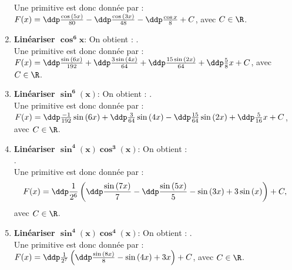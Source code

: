 \begin{correction}
\begin{enumerate}
Une primitive est donc donn\'ee par : $F(x) = \ddp\frac{\cos{(5x)}}{80}-\ddp\frac{\cos{(3x)}}{48}-\ddp\frac{\cos{x}}{8}+C$, avec $C \in \R$.
\item \textbf{Lin\'eariser $\mathbf{\cos^6{x}}$}: On obtient : .\\
Une primitive est donc donn\'ee par : $F(x) = \ddp\frac{\sin{(6x)}}{192}+\ddp\frac{3\sin{(4x)}}{64}+\ddp\frac{15\sin{(2x)}}{64}+\ddp\frac{5}{8}x+C$, avec $C \in \R$.
\item \textbf{Lin\'eariser $\mathbf{\sin^6{(x)}}$}: On obtient : .\\
Une primitive est donc donn\'ee par : $F(x) = \ddp\frac{-1}{192} \sin{(6x)} +\ddp\frac{3}{64}\sin{(4x)}-\ddp\frac{15}{64}\sin{(2x)}+\ddp\frac{5}{16}x+C$, avec $C \in \R$.
\item \textbf{Lin\'eariser $\mathbf{\sin^4{(x)}\cos^3{(x)}}$}: On obtient :\\
 .\\
 
Une primitive est donc donn\'ee par : $$F(x) = \ddp\frac{1}{2^6}\left( \ddp\frac{ \sin{(7x)}}{7} -\ddp\frac{\sin{(5x)}}{5}-\sin{(3x)}+3\sin{(x)} \right)+C,$$ avec $C \in \R$.
\item \textbf{Lin\'eariser $\mathbf{\sin^4{(x)}\cos^4{(x)}}$}: On obtient : .\\
Une primitive est donc donn\'ee par : $F(x) = \ddp\frac{1}{2^7}\left(  \ddp\frac{\sin{(8x)}}{8}-\sin{(4x)}+3x \right)+C$, avec $C \in \R$.
\end{enumerate}
\end{correction}